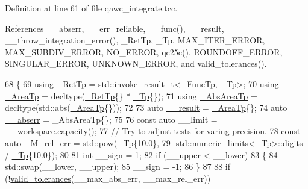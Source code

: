 Definition at line 61 of file qawc\+\_\+integrate.\+tcc.



References \+\_\+\+\_\+abserr, \+\_\+\+\_\+err\+\_\+reliable, \+\_\+\+\_\+func(), \+\_\+\+\_\+result, \+\_\+\+\_\+throw\+\_\+integration\+\_\+error(), \+\_\+\+Ret\+Tp, \+\_\+\+Tp, M\+A\+X\+\_\+\+I\+T\+E\+R\+\_\+\+E\+R\+R\+OR, M\+A\+X\+\_\+\+S\+U\+B\+D\+I\+V\+\_\+\+E\+R\+R\+OR, N\+O\+\_\+\+E\+R\+R\+OR, qc25c(), R\+O\+U\+N\+D\+O\+F\+F\+\_\+\+E\+R\+R\+OR, S\+I\+N\+G\+U\+L\+A\+R\+\_\+\+E\+R\+R\+OR, U\+N\+K\+N\+O\+W\+N\+\_\+\+E\+R\+R\+OR, and valid\+\_\+tolerances().


\begin{DoxyCode}
68     \{
69       \textcolor{keyword}{using} \hyperlink{namespace____gnu__cxx_a886e03ece3d53ff7fa6c098a40f93fa5}{\_RetTp} = std::invoke\_result\_t<\_FuncTp, \_Tp>;
70       \textcolor{keyword}{using} \hyperlink{namespace____gnu__cxx_ae97a51b75e19c30f48d27fac4664de6e}{\_AreaTp} = decltype(\hyperlink{namespace____gnu__cxx_a886e03ece3d53ff7fa6c098a40f93fa5}{\_RetTp}\{\} * \hyperlink{namespace____gnu__cxx_a3b19a9c800ca194374ef9172290f7d79}{\_Tp}\{\});
71       \textcolor{keyword}{using} \hyperlink{namespace____gnu__cxx_a2f005089fd7e29a63d4165c56a5f4235}{\_AbsAreaTp} = decltype(std::abs(\hyperlink{namespace____gnu__cxx_ae97a51b75e19c30f48d27fac4664de6e}{\_AreaTp}\{\}));
72 
73       \textcolor{keyword}{auto} \hyperlink{namespace____gnu__cxx_a500ea9f53aeaecd8c2ae657503450578}{\_\_result} = \hyperlink{namespace____gnu__cxx_ae97a51b75e19c30f48d27fac4664de6e}{\_AreaTp}\{\};
74       \textcolor{keyword}{auto} \hyperlink{namespace____gnu__cxx_a72f736cff127f1574e91a301de9e074b}{\_\_abserr} = \_AbsAreaTp\{\};
75 
76       \textcolor{keyword}{const} \textcolor{keyword}{auto} \_\_limit = \_\_workspace.capacity();
77       \textcolor{comment}{// Try to adjust tests for varing precision.}
78       \textcolor{keyword}{const} \textcolor{keyword}{auto} \_M\_rel\_err = std::pow(\hyperlink{namespace____gnu__cxx_a3b19a9c800ca194374ef9172290f7d79}{\_Tp}\{10.0\},
79                                  -std::numeric\_limits<\_Tp>::digits / \hyperlink{namespace____gnu__cxx_a3b19a9c800ca194374ef9172290f7d79}{\_Tp}\{10.0\});
80 
81       \textcolor{keywordtype}{int} \_\_sign = 1;
82       \textcolor{keywordflow}{if} (\_\_upper < \_\_lower)
83         \{
84           std::swap(\_\_lower, \_\_upper);
85           \_\_sign = -1;
86         \}
87 
88       \textcolor{keywordflow}{if} (!\hyperlink{namespace____gnu__cxx_a86b1d89b2e2cb97614fdf3425d3dccd5}{valid\_tolerances}(\_\_max\_abs\_err, \_\_max\_rel\_err))

\end{DoxyCode}
